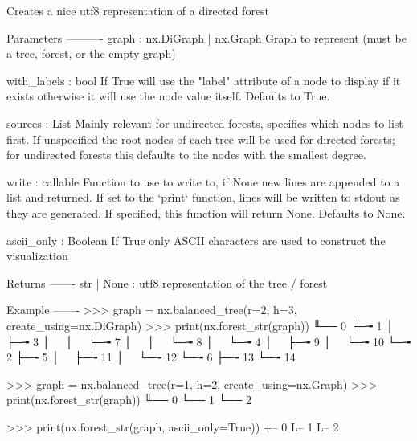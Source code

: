 \begin{DoxyVerb}Creates a nice utf8 representation of a directed forest

Parameters
----------
graph : nx.DiGraph | nx.Graph
    Graph to represent (must be a tree, forest, or the empty graph)

with_labels : bool
    If True will use the "label" attribute of a node to display if it
    exists otherwise it will use the node value itself. Defaults to True.

sources : List
    Mainly relevant for undirected forests, specifies which nodes to list
    first. If unspecified the root nodes of each tree will be used for
    directed forests; for undirected forests this defaults to the nodes
    with the smallest degree.

write : callable
    Function to use to write to, if None new lines are appended to
    a list and returned. If set to the `print` function, lines will
    be written to stdout as they are generated. If specified,
    this function will return None. Defaults to None.

ascii_only : Boolean
    If True only ASCII characters are used to construct the visualization

Returns
-------
str | None :
    utf8 representation of the tree / forest

Example
-------
>>> graph = nx.balanced_tree(r=2, h=3, create_using=nx.DiGraph)
>>> print(nx.forest_str(graph))
╙── 0
    ├─╼ 1
    │   ├─╼ 3
    │   │   ├─╼ 7
    │   │   └─╼ 8
    │   └─╼ 4
    │       ├─╼ 9
    │       └─╼ 10
    └─╼ 2
        ├─╼ 5
        │   ├─╼ 11
        │   └─╼ 12
        └─╼ 6
            ├─╼ 13
            └─╼ 14


>>> graph = nx.balanced_tree(r=1, h=2, create_using=nx.Graph)
>>> print(nx.forest_str(graph))
╙── 0
    └── 1
        └── 2

>>> print(nx.forest_str(graph, ascii_only=True))
+-- 0
    L-- 1
        L-- 2
\end{DoxyVerb}
 